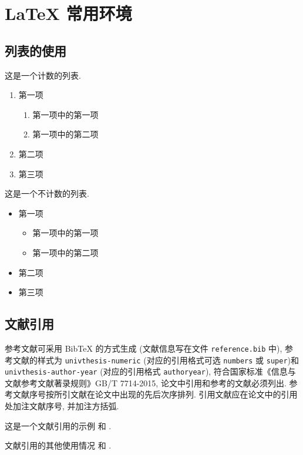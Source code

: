 

\chapter{LaTeX 常用环境}\label{chap:LaTeXEnv}

\section{列表的使用}

这是一个计数的列表.
\begin{enumerate}%
  \item 第一项
    \begin{enumerate}
      \item 第一项中的第一项
      \item 第一项中的第二项
    \end{enumerate}
  \item 第二项
  \item 第三项
\end{enumerate}

这是一个不计数的列表.
\begin{itemize}%
  \item 第一项
  \begin{itemize}
    \item 第一项中的第一项
    \item 第一项中的第二项
  \end{itemize}
  \item 第二项
  \item 第三项
\end{itemize}


\section{文献引用}

参考文献可采用 BibTeX 的方式生成 (文献信息写在文件 \verb|reference.bib| 中), 参考文献的样式为 \verb|univthesis-numeric| (对应的引用格式可选 \verb|numbers| 或  \verb|super|)和 \verb|univthesis-author-year| (对应的引用格式 \verb|authoryear|), 符合国家标准《信息与文献参考文献著录规则》GB/T 7714-2015, 论文中引用和参考的文献必须列出. 参考文献序号按所引文献在论文中出现的先后次序排列. 引用文献应在论文中的引用处加注文献序号, 并加注方括弧.

这是一个文献引用的示例 \cite{Tadmor2012} 和 \cite{LiLiu1997,Adams2003,TreWei2014}.

文献引用的其他使用情况 \cite[定理~1.1]{LiLiu1997} 和 \cite{Shen1994,LiuEtAl2024}.


